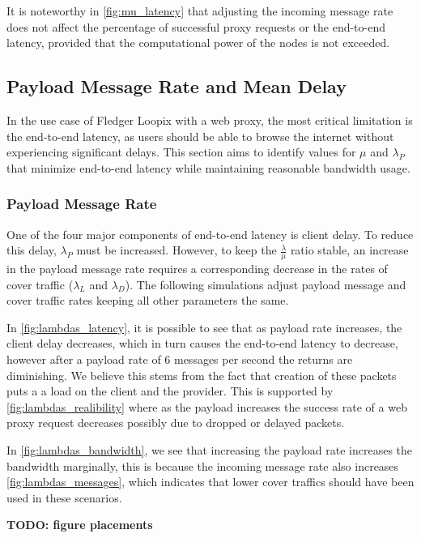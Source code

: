 \documentclass[a4paper,11pt,oneside]{report}
\begin{document}
It is noteworthy in \autoref{fig:mu_latency} that adjusting the incoming message rate does not affect the percentage of successful proxy requests or the end-to-end latency, provided that the computational power of the nodes is not exceeded.
\subsection{Payload Message Rate and Mean Delay}
In the use case of Fledger Loopix with a web proxy, the most critical limitation is the end-to-end latency, as users should be able to browse the internet without experiencing significant delays. This section aims to identify values for \(\mu\) and \(\lambda_P\) that minimize end-to-end latency while maintaining reasonable bandwidth usage.

\subsubsection{Payload Message Rate}
One of the four major components of end-to-end latency is client delay. To reduce this delay, \(\lambda_P\) must be increased. However, to keep the \(\frac{\lambda}{\mu}\) ratio stable, an increase in the payload message rate requires a corresponding decrease in the rates of cover traffic (\(\lambda_L\) and \(\lambda_D\)). The following simulations adjust payload message and cover traffic rates keeping all other parameters the same.

In \autoref{fig:lambdas_latency}, it is possible to see that as payload rate increases, the client delay decreases, which in turn causes the end-to-end latency to decrease, however after a payload rate of 6 messages per second the returns are diminishing. We believe this stems from the fact that creation of these packets puts a a load on the client and the provider. This is supported by \autoref{fig:lambdas_realibility} where as the payload increases the success rate of a web proxy request decreases possibly due to dropped or delayed packets.

In \autoref{fig:lambdas_bandwidth}, we see that increasing the payload rate increases the bandwidth marginally, this is because the incoming message rate also increases \autoref{fig:lambdas_messages}, which indicates that lower cover traffics should have been used in these scenarios.

\textbf{TODO: figure placements}
\end{document}
